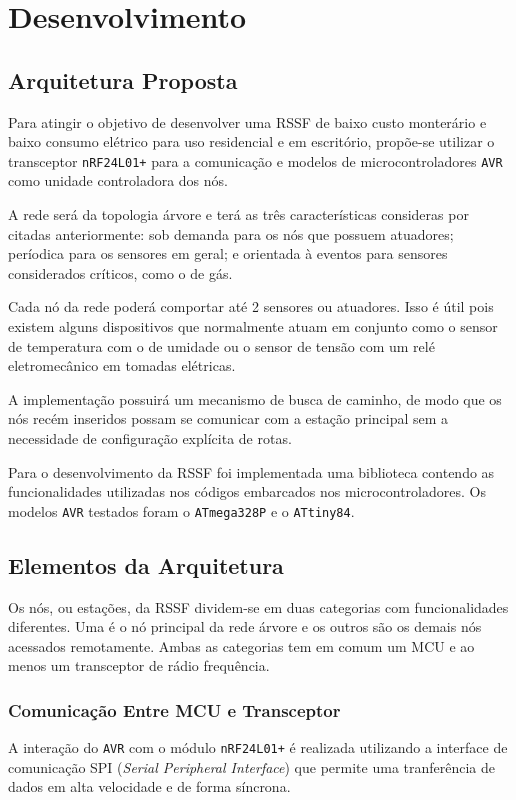 \chapter{Desenvolvimento}
\label{cap:6}

\section{Arquitetura Proposta}
Para atingir o objetivo de desenvolver uma RSSF de baixo custo monterário e baixo consumo elétrico para uso
residencial e em escritório, propõe-se utilizar o transceptor \texttt{nRF24L01+} para a comunicação e modelos de
microcontroladores \texttt{AVR} como unidade controladora dos nós.

A rede será da topologia árvore e terá as três características consideras por
 citadas anteriormente: sob demanda para os nós que possuem atuadores;
períodica para os sensores em geral; e orientada à eventos para sensores considerados críticos, como o de gás.

Cada nó da rede poderá comportar até 2 sensores ou atuadores. Isso é útil pois existem alguns dispositivos que
normalmente atuam em conjunto como o sensor de temperatura com o de umidade ou o sensor de tensão com um relé
eletromecânico em tomadas elétricas.

A implementação possuirá um mecanismo de busca de caminho, de modo que os nós recém inseridos possam se
comunicar com a estação principal sem a necessidade de configuração explícita de rotas.

Para o desenvolvimento da RSSF foi implementada uma biblioteca contendo as funcionalidades utilizadas nos
códigos embarcados nos microcontroladores. Os modelos \texttt{AVR} testados foram o \texttt{ATmega328P} e o
\texttt{ATtiny84}.

\section{Elementos da Arquitetura}
Os nós, ou estações, da RSSF dividem-se em duas categorias com funcionalidades diferentes. Uma é o nó
principal da rede árvore e os outros são os demais nós acessados remotamente. Ambas as categorias tem em comum
um MCU e ao menos um transceptor de rádio frequência.

\subsection{Comunicação Entre MCU e Transceptor}
A interação do \texttt{AVR} com o módulo \texttt{nRF24L01+} é realizada utilizando a interface de comunicação
SPI (\textit{Serial Peripheral Interface}) que permite uma tranferência de dados em alta velocidade e de forma
síncrona.

